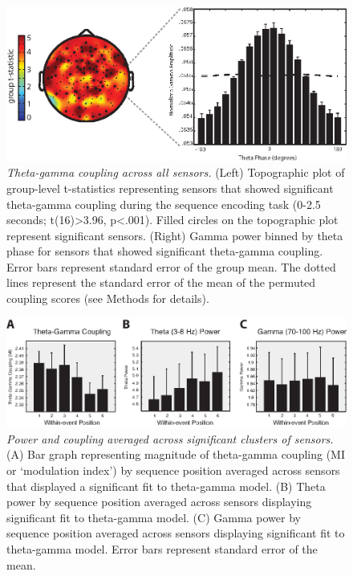 \begin{figure}
  \centering
  \includegraphics[width=\textwidth]{figures/chapter3_suppfigure2.eps}
  \caption[Theta-gamma coupling across all sensors]{\textit{Theta-gamma coupling across all sensors.} (Left) Topographic plot of group-level t-statistics representing sensors that showed significant theta-gamma coupling during the sequence encoding task (0-2.5 seconds; t(16)>3.96, p<.001).  Filled circles on the topographic plot represent significant sensors. (Right) Gamma power binned by theta phase for sensors that showed significant theta-gamma coupling.  Error bars represent standard error of the group mean.  The dotted lines represent the standard error of the mean of the permuted coupling scores (see Methods for details).}
  \label{chapter3_suppfigure2}
\end{figure}

\begin{figure}
  \centering
  \includegraphics[width=\textwidth]{figures/chapter3_suppfigure3.eps}
  \caption[Power and coupling averaged across significant clusters of sensors]{\textit{Power and coupling averaged across significant clusters of sensors.} (A) Bar graph representing magnitude of theta-gamma coupling (MI or ‘modulation index’) by sequence position averaged across sensors that displayed a significant fit to theta-gamma model.  (B) Theta power by sequence position averaged across sensors displaying significant fit to theta-gamma model. (C) Gamma power by sequence position averaged across sensors displaying significant fit to theta-gamma model.  Error bars represent standard error of the mean.}
  \label{chapter3_suppfigure3}
\end{figure}

